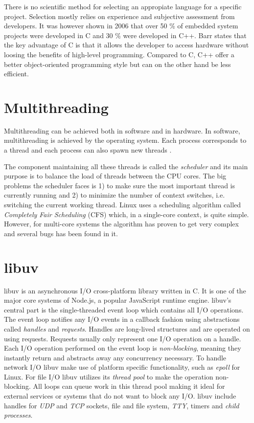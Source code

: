 There is no scientific method for selecting an appropiate language for a
specific project. Selection mostly relies on experience and subjective
assessment from developers. It was however shown in 2006 that over 50 \% of
embedded system projects were developed in C and 30 \% were developed in C++.
Barr \cite{barr1999programming} states that the key advantage of C is that it
allows the developer to access hardware without loosing the benefits of
high-level programming. Compared to C, C++ offer a better object-oriented
programming style but can on the other hand be less efficient.
\cite{nahas2012choosing}

\section{Multithreading}

Multithreading can be achieved both in software and in hardware. In software,
multithreading is achieved by the operating system. Each process corresponds to
a thread and each process can also spawn new threads
\cite{silberschatz2014operating}.

The component maintaining all these threads is called the \textit{scheduler}
and its main purpose is to balance the load of threads between the CPU cores.
The big problems the scheduler faces is 1) to make sure the most important
thread is currently running and 2) to minimize the number of context switches,
i.e. switching the current working thread. Linux uses a scheduling algorithm
called \textit{Completely Fair Scheduling} (CFS) which, in a single-core
context, is quite simple. However, for multi-core systems the algorithm has
proven to get very complex and several bugs has been found in it.
\cite{lozi2016linux}

\section{libuv}

libuv is an asynchronous I/O cross-platform library written in C. It is one of
the major core systems of Node.js, a popular JavaScript runtime engine. libuv's
central part is the single-threaded event loop which contains all I/O
operations. The event loop notifies any I/O events in a callback fashion using
abstractions called \textit{handles} and \textit{requests}. Handles are
long-lived structures and are operated on using requests. Requests usually only
represent one I/O operation on a handle. Each I/O operation performed on the
event loop is \textit{non-blocking}, meaning they instantly return and
abstracts away any concurrency necessary. To handle network I/O libuv make use
of platform specific functionality, such as \textit{epoll} for Linux. For file
I/O libuv utilizes its \textit{thread pool} to make the operation non-blocking.
All loops can queue work in this thread pool making it ideal for external
services or systems that do not want to block any I/O. libuv include handles
for \textit{UDP} and \textit{TCP} sockets, file and file system, \textit{TTY},
timers and \textit{child processes}. \cite{libuv-docs}

